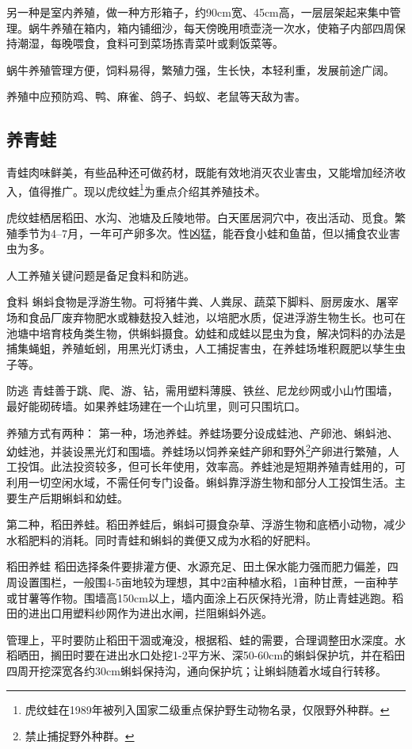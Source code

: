 \documentclass{ctexbook}
\begin{document}
另一种是室内养殖，做一种方形箱子，约90cm宽、45cm高，一层层架起来集中管理。蜗牛养殖在箱内，箱内铺细沙，每天傍晚用喷壶浇一次水，使箱子内部四周保持潮湿，每晚喂食，食料可到菜场拣青菜叶或剩饭菜等。

蜗牛养殖管理方便，饲料易得，繁殖力强，生长快，本轻利重，发展前途广阔。

养殖中应预防鸡、鸭、麻雀、鸽子、蚂蚁、老鼠等天敌为害。
\subsection{养青蛙}
青蛙肉味鲜美，有些品种还可做药材，既能有效地消灭农业害虫，又能增加经济收入，值得推广。现以虎纹蛙\footnote{虎纹蛙在1989年被列入国家二级重点保护野生动物名录，仅限野外种群。}为重点介绍其养殖技术。

虎纹蛙栖居稻田、水沟、池塘及丘陵地带。白天匿居洞穴中，夜出活动、觅食。繁殖季节为4--7月，一年可产卵多次。性凶猛，能吞食小蛙和鱼苗，但以捕食农业害虫为多。

人工养殖关键问题是备足食料和防逃。

食料 蝌蚪食物是浮游生物。可将猪牛粪、人粪尿、蔬菜下脚料、厨房废水、屠宰场和食品厂废弃物肥水或糠麸投入蛙池，以培肥水质，促进浮游生物生长。也可在池塘中培育枝角类生物，供蝌蚪摄食。幼蛙和成蛙以昆虫为食，解决饲料的办法是捕集蝇蛆，养殖蚯蚓，用黑光灯诱虫，人工捕捉害虫，在养蛙场堆积厩肥以孳生虫子等。

防逃 青蛙善于跳、爬、游、钻，需用塑料薄膜、铁丝、尼龙纱网或小山竹围墙，最好能砌砖墙。如果养蛙场建在一个山坑里，则可只围坑口。

养殖方式有两种：
第一种，场池养蛙。养蛙场要分设成蛙池、产卵池、蝌蚪池、幼蛙池，并装设黑光灯和围墙。养蛙场以饲养亲蛙产卵和野外\footnote{禁止捕捉野外种群。}产卵进行繁殖，人工投饵。此法投资较多，但可长年使用，效率高。养蛙池是短期养殖青蛙用的，可利用一切空闲水域，不需任何专门设备。蝌蚪靠浮游生物和部分人工投饵生活。主要生产后期蝌蚪和幼蛙。

第二种，稻田养蛙。稻田养蛙后，蝌蚪可摄食杂草、浮游生物和底栖小动物，减少水稻肥料的消耗。同时青蛙和蝌蚪的粪便又成为水稻的好肥料。

稻田养蛙 稻田选择条件要排灌方便、水源充足、田土保水能力强而肥力偏差，四周设置围栏，一般围4-5亩地较为理想，其中2亩种植水稻，1亩种甘蔗，一亩种芋或甘薯等作物。围墙高150cm以上，墙内面涂上石灰保持光滑，防止青蛙逃跑。稻田的进出口用塑料纱网作为进出水闸，拦阻蝌蚪外逃。

管理上，平时要防止稻田干涸或淹没，根据稻、蛙的需要，合理调整田水深度。水稻晒田，搁田时要在进出水口处挖1-2平方米、深50-60cm的蝌蚪保护坑，并在稻田四周开挖深宽各约30cm蝌蚪保持沟，通向保护坑；让蝌蚪随着水域自行转移。
\end{document}
